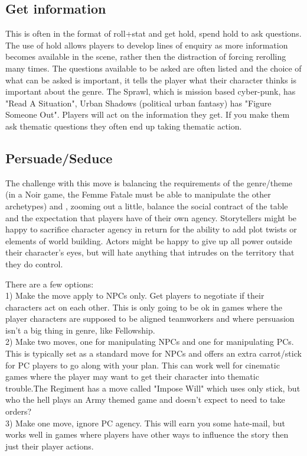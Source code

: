 \documentclass{tufte-handout}
\begin{document}
\subsection{Get information}
This is often in the format of roll+stat and get hold, spend hold to ask questions. The use of hold allows players to develop lines of enquiry as more information becomes available in the scene, rather then the distraction of forcing rerolling many times. 
The questions available to be asked are often listed and the choice of what can be asked is important, it tells the player what their character thinks is important about the genre. The Sprawl, which is mission based cyber-punk, has "Read A Situation", Urban Shadows (political urban fantasy) has "Figure Someone Out".
Players will act on the information they get. If you make them ask thematic questions they often end up taking thematic action.

\subsection{Persuade/Seduce}
The challenge with this move is  balancing the requirements of the genre/theme (in a Noir game, the Femme Fatale must be able to manipulate the other archetypes) and , zooming out a little, balance the social contract of the table and the expectation that players have of their own agency. Storytellers might be happy to sacrifice character agency in return for the ability to add plot twists or elements of world building. Actors might be happy to give up all power outside their character's eyes, but will hate anything that intrudes on the territory that they do control.

There are a few options:\\
1) Make the move apply to NPCs only. Get players to negotiate if their characters act on each other. This is only going to be ok in games where the player characters are supposed to be aligned teamworkers and where persuasion isn't a big thing in genre, like Fellowship. \\
2) Make two moves, one for manipulating NPCs and one for manipulating PCs. This is typically set as a standard move for NPCs and offers an extra carrot/stick for PC players to go along with your plan. This can work well for cinematic games where the player may want to get their character into thematic trouble.The Regiment has a move called "Impose Will" which uses only stick, but who the hell plays an Army themed game and doesn't expect to need to take orders?\\
3) Make one move, ignore PC agency. This will earn you some hate-mail, but works well in games where players have other ways to influence the story then just their player actions. 
\end{document}
